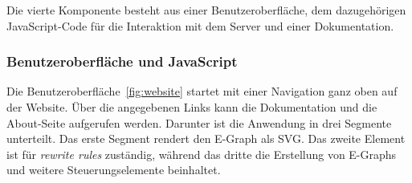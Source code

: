 Die vierte Komponente besteht aus einer Benutzeroberfläche, dem dazugehörigen JavaScript-Code für die Interaktion mit dem Server und einer Dokumentation.

\subsubsection{Benutzeroberfläche und JavaScript}


Die Benutzeroberfläche~\ref{fig:website} startet mit einer Navigation ganz oben auf der Website. Über die angegebenen Links kann die Dokumentation und die About-Seite aufgerufen werden.
Darunter ist die Anwendung in drei Segmente unterteilt. Das erste Segment rendert den E-Graph als SVG. Das zweite Element ist für \textit{rewrite rules} zuständig, während das dritte 
die Erstellung von E-Graphs und weitere Steuerungselemente beinhaltet.




